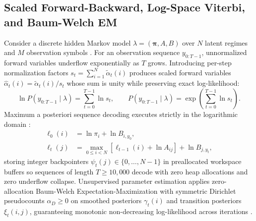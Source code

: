 \documentclass{article}
\begin{document}
\subsection{Scaled Forward-Backward, Log-Space Viterbi, and Baum-Welch EM}
Consider a discrete hidden Markov model $\lambda = (\boldsymbol{\pi}, A, B)$ over $N$ latent regimes and $M$ observation symbols \cite{rabiner1989tutorial}. For an observation sequence $y_{0:T-1}$, unnormalized forward variables underflow exponentially as $T$ grows. Introducing per-step normalization factors $s_t = \sum_{i=1}^N \tilde{\alpha}_t(i)$ produces scaled forward variables $\hat{\alpha}_t(i) = \tilde{\alpha}_t(i) / s_t$ whose sum is unity while preserving exact log-likelihood:
\begin{equation}
\ln P(y_{0:T-1} \mid \lambda) = \sum_{t=0}^{T-1} \ln s_t, \qquad P(y_{0:T-1} \mid \lambda) = \exp\!\left(\sum_{t=0}^{T-1} \ln s_t\right).
\end{equation}
Maximum a posteriori sequence decoding executes strictly in the logarithmic domain \cite{viterbi1967error}:
\begin{align}
\ell_0(i) &= \ln \pi_i + \ln B_{i, y_0}, \\
\ell_t(j) &= \max_{0 \le i < N} \left[\ell_{t-1}(i) + \ln A_{ij}\right] + \ln B_{j, y_t},
\end{align}
storing integer backpointers $\psi_t(j) \in \{0, \dots, N-1\}$ in preallocated workspace buffers so sequences of length $T \ge 10{,}000$ decode with zero heap allocations and zero underflow collapse. Unsupervised parameter estimation applies zero-allocation Baum-Welch Expectation-Maximization with symmetric Dirichlet pseudocounts $\alpha_D \ge 0$ on smoothed posteriors $\gamma_t(i)$ and transition posteriors $\xi_t(i, j)$, guaranteeing monotonic non-decreasing log-likelihood across iterations \cite{rabiner1989tutorial}.



\end{document}
